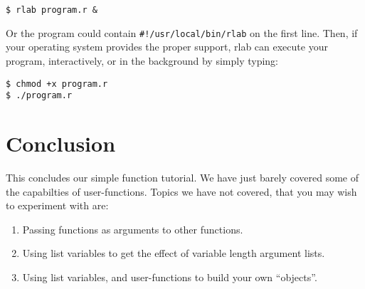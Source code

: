 \begin{verbatim}
$ rlab program.r &
\end{verbatim}

   Or the program could contain \verb+#!/usr/local/bin/rlab+ on the
   first line. Then, if your operating system provides the proper
   support, rlab can execute your program, interactively, or in the
   background by simply typing:

\begin{verbatim}
$ chmod +x program.r
$ ./program.r
\end{verbatim}

\section{Conclusion}

   This concludes our simple function tutorial. We have just barely
   covered some of the capabilties of user-functions. Topics we have
   not covered, that you may wish to experiment with are:

   \begin{enumerate}
      \item Passing functions as arguments to other functions.
      \item Using list variables to get the effect of variable length
            argument lists.
      \item Using list variables, and user-functions to build your own
            ``objects''.
   \end{enumerate}


